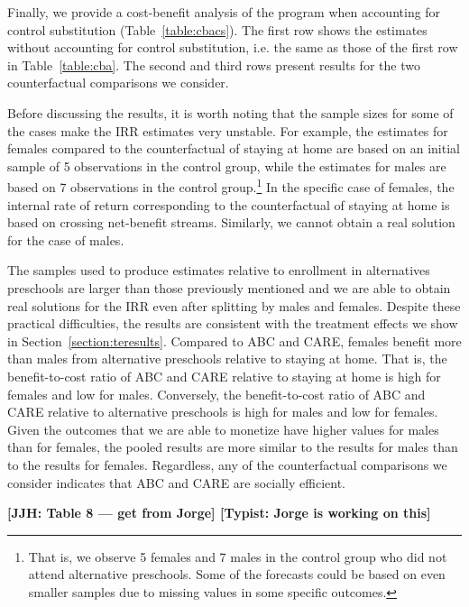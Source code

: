 Finally, we provide a cost-benefit analysis of the program when accounting for control substitution (Table~\ref{table:cbacs}). The first row shows the estimates without accounting for control substitution, i.e. the same as those of the first row in Table~\ref{table:cba}. The second and third rows present results for the two counterfactual comparisons we consider.

Before discussing the results, it is worth noting that the sample sizes for some of the cases make the IRR estimates very unstable. For example, the estimates for females compared to the counterfactual of staying at home are based on an initial sample of 5 observations in the control group, while the estimates for males are based on 7  observations in the control group.\footnote{That is, we observe 5 females and 7 males in the control group who did not attend alternative preschools. Some of the forecasts could be based on even smaller samples due to missing values in some specific outcomes.} In the specific case of females, the internal rate of return corresponding to the counterfactual of staying at home is based on crossing net-benefit streams. Similarly, we cannot obtain a real solution for the case of males.

The samples used to produce estimates relative to enrollment in alternatives preschools are larger than those previously mentioned and we are able to obtain real solutions for the IRR even after splitting by males and females. Despite these practical difficulties, the results are consistent with the treatment effects we show in Section~\ref{section:teresults}. Compared to ABC and CARE, females benefit more than males from alternative preschools relative to staying at home. That is, the benefit-to-cost ratio of ABC and CARE relative to staying at home is high for females and low for males. Conversely, the benefit-to-cost ratio of ABC and CARE relative to alternative preschools is high for males and low for females. Given the outcomes that we are able to monetize have higher values for males than for females, the pooled results are more similar to the results for males than to the results for females. Regardless, any of the counterfactual comparisons we consider indicates that ABC and CARE are socially efficient.

\textbf{[JJH: Table 8 --- get from Jorge] [Typist: Jorge is working on this]}

